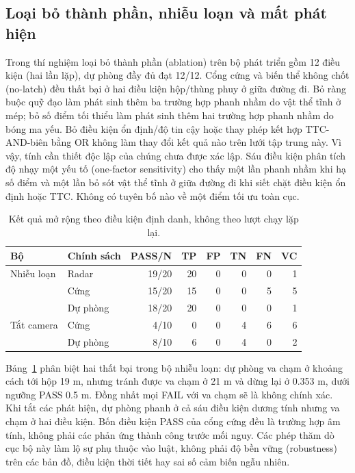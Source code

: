 \documentclass[11pt,a4paper]{article}
\begin{document}
\subsection{Loại bỏ thành phần, nhiễu loạn và mất phát hiện}
Trong thí nghiệm loại bỏ thành phần (ablation) trên bộ phát triển gồm 12 điều kiện (hai
lần lặp), dự phòng đầy đủ đạt 12/12. Cổng cứng và biến thể không chốt
(no-latch) đều thất bại ở hai điều kiện hộp/thùng phuy ở giữa đường đi. Bỏ
ràng buộc quỹ đạo làm phát sinh thêm ba trường hợp phanh nhầm do vật thể tĩnh
ở mép; bỏ số điểm tối thiểu làm phát sinh thêm hai trường hợp phanh nhầm do
bóng ma yếu. Bỏ điều kiện ổn định/độ tin cậy hoặc thay phép kết hợp
TTC-AND-biên bằng OR không làm thay đổi kết quả nào trên lưới tập trung này. Vì
vậy, tính cần thiết độc lập của chúng chưa được xác lập. Sáu điều kiện phân
tích độ nhạy một yếu tố (one-factor sensitivity) cho thấy một lần phanh nhầm
khi hạ số điểm và một lần bỏ sót vật thể tĩnh ở giữa đường đi khi siết chặt
điều kiện ổn định hoặc TTC. Không có tuyên bố nào về một điểm tối ưu toàn cục.

\begin{table}[t]
\caption{Kết quả mở rộng theo điều kiện định danh, không theo lượt chạy lặp
lại.}
\label{tab:extended}
\centering\small
\setlength{\tabcolsep}{4pt}
\begin{tabular*}{\textwidth}{@{\extracolsep{\fill}}llrrrrrr}
\toprule Bộ & Chính sách & PASS/N & TP & FP & TN & FN & VC\\ \midrule
Nhiễu loạn & Radar & 19/20 & 20 & 0 & 0 & 0 & 1\\
 & Cứng & 15/20 & 15 & 0 & 0 & 5 & 5\\
 & Dự phòng & 18/20 & 20 & 0 & 0 & 0 & 1\\
\midrule
Tắt camera & Cứng & 4/10 & 0 & 0 & 4 & 6 & 6\\
 & Dự phòng & 8/10 & 6 & 0 & 4 & 0 & 2\\
\bottomrule
\end{tabular*}
\end{table}

Bảng~\ref{tab:extended} phân biệt hai thất bại trong bộ nhiễu loạn: dự phòng
va chạm ở khoảng cách tới hộp 19 m, nhưng tránh được va chạm ở 21 m và dừng
lại ở 0.353 m, dưới ngưỡng PASS 0.5 m. Đồng nhất mọi FAIL với va chạm sẽ là
không chính xác. Khi tắt các phát hiện, dự phòng phanh ở cả sáu điều kiện
dương tính nhưng va chạm ở hai điều kiện. Bốn điều kiện PASS của cổng cứng đều
là trường hợp âm tính, không phải các phản ứng thành công trước mối nguy. Các
phép thăm dò cục bộ này làm lộ sự phụ thuộc vào luật, không phải độ bền vững
(robustness) trên các bản đồ, điều kiện thời tiết hay sai số cảm biến ngẫu
nhiên.
\end{document}
